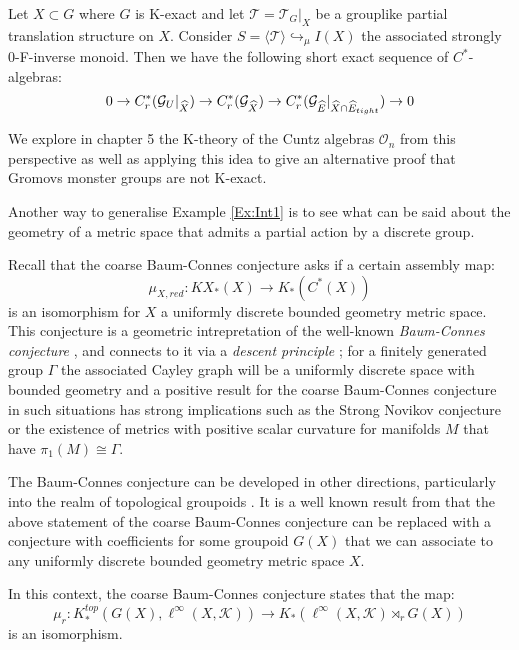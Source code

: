 \begin{thm}
Let $X \subset G$ where $G$ is K-exact and let $\mathcal{T}=\mathcal{T}_{G}|_{X}$ be a grouplike partial translation structure on $X$. Consider $S=\langle \mathcal{T} \rangle \hookrightarrow_{\mu} I(X)$ the associated strongly 0-F-inverse monoid. Then we have the following short exact sequence of $C^{*}$-algebras:
\begin{equation*}
0 \rightarrow C^{*}_{r}(\mathcal{G}_{U}|_{\widehat{X}}) \rightarrow C^{*}_{r}(\mathcal{G}_{\widehat{X}}) \rightarrow C^{*}_{r}(\mathcal{G}_{\widehat{E}}|_{\widehat{X}\cap\widehat{E}_{tight}}) \rightarrow 0
\end{equation*}
\end{thm}

We explore in chapter 5 the K-theory of the Cuntz algebras $\mathcal{O}_{n}$ from this perspective as well as applying this idea to give an alternative proof that Gromovs monster groups are not K-exact.

Another way to generalise Example \ref{Ex:Int1} is to see what can be said about the geometry of a metric space that admits a partial action by a discrete group. 

Recall that the coarse Baum-Connes conjecture \cite{MR1388312} asks if a certain assembly map:
\begin{equation*}
\mu_{X,red}:KX_{*}(X) \longrightarrow K_{*}(C^{*}(X))
\end{equation*}
is an isomorphism for $X$ a uniformly discrete bounded geometry metric space. This conjecture is a geometric intrepretation of the well-known \textit{Baum-Connes conjecture} \cite{MR1292018}, and connects to it via a \textit{descent principle} \cite{MR1399087,MR1817560}; for a finitely generated group $\Gamma$ the associated Cayley graph will be a uniformly discrete space with bounded geometry and a positive result for the coarse Baum-Connes conjecture in such situations has strong implications such as the Strong Novikov conjecture \cite{MR866507} or the existence of metrics with positive scalar curvature for manifolds $M$ that have $\pi_{1}(M)\cong \Gamma$.

The Baum-Connes conjecture can be developed in other directions, particularly into the realm of topological groupoids \cite{MR1798599}. It is a well known result from \cite{MR1905840} that the above statement of the coarse Baum-Connes conjecture can be replaced with a conjecture with coefficients for some groupoid $G(X)$ that we can associate to any uniformly discrete bounded geometry metric space $X$.

In this context, the coarse Baum-Connes conjecture states that the map:
\begin{equation*}
\mu_{r}:K_{*}^{top}(G(X), \ell^{\infty}(X,\mathcal{K})) \rightarrow K_{*}(\ell^{\infty}(X,\mathcal{K})\rtimes_{r}G(X))
\end{equation*}
is an isomorphism.

